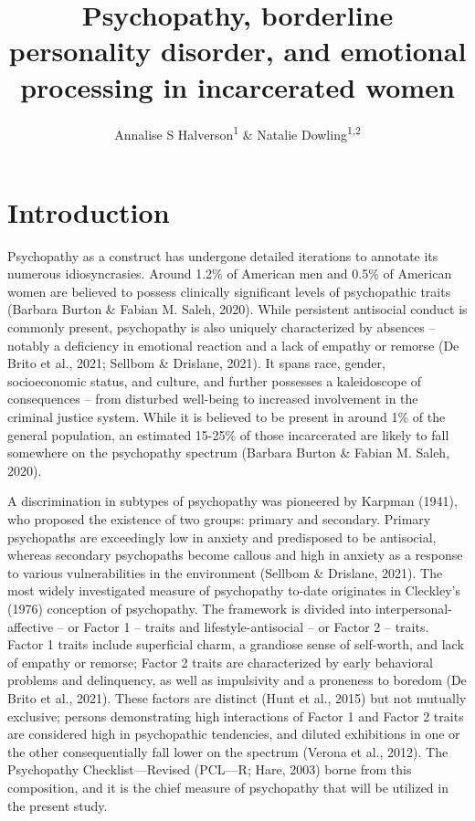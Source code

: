 \documentclass[
  man,floatsintext]{apa7}
\title{Psychopathy, borderline personality disorder, and emotional processing in incarcerated women}
\author{Annalise S Halverson\textsuperscript{1} \& Natalie Dowling\textsuperscript{1,2}}
\date{}
\affiliation{\vspace{0.5cm}\textsuperscript{1} University of Chicago\\\textsuperscript{2} Department of Psychology}
\begin{document}
\maketitle

\hypertarget{introduction}{%
\section{Introduction}\label{introduction}}

Psychopathy as a construct has undergone detailed iterations to annotate its numerous idiosyncrasies. Around 1.2\% of American men and 0.5\% of American women are believed to possess clinically significant levels of psychopathic traits (Barbara Burton \& Fabian M. Saleh, 2020). While persistent antisocial conduct is commonly present, psychopathy is also uniquely characterized by absences -- notably a deficiency in emotional reaction and a lack of empathy or remorse (De Brito et al., 2021; Sellbom \& Drislane, 2021). It spans race, gender, socioeconomic status, and culture, and further possesses a kaleidoscope of consequences -- from disturbed well-being to increased involvement in the criminal justice system. While it is believed to be present in around 1\% of the general population, an estimated 15-25\% of those incarcerated are likely to fall somewhere on the psychopathy spectrum (Barbara Burton \& Fabian M. Saleh, 2020).

A discrimination in subtypes of psychopathy was pioneered by Karpman (1941), who proposed the existence of two groups: primary and secondary. Primary psychopaths are exceedingly low in anxiety and predisposed to be antisocial, whereas secondary psychopaths become callous and high in anxiety as a response to various vulnerabilities in the environment (Sellbom \& Drislane, 2021). The most widely investigated measure of psychopathy to-date originates in Cleckley's (1976) conception of psychopathy. The framework is divided into interpersonal-affective -- or Factor 1 -- traits and lifestyle-antisocial -- or Factor 2 -- traits. Factor 1 traits include superficial charm, a grandiose sense of self-worth, and lack of empathy or remorse; Factor 2 traits are characterized by early behavioral problems and delinquency, as well as impulsivity and a proneness to boredom (De Brito et al., 2021). These factors are distinct (Hunt et al., 2015) but not mutually exclusive; persons demonstrating high interactions of Factor 1 and Factor 2 traits are considered high in psychopathic tendencies, and diluted exhibitions in one or the other consequentially fall lower on the spectrum (Verona et al., 2012). The Psychopathy Checklist---Revised (PCL---R; Hare, 2003) borne from this composition, and it is the chief measure of psychopathy that will be utilized in the present study.
\end{document}
